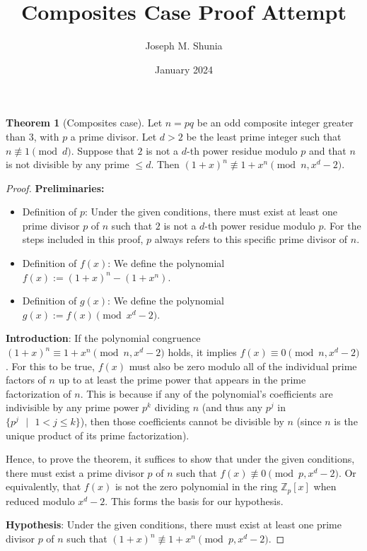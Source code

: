 \documentclass{article}
\title{Composites Case Proof Attempt}
\author{Joseph M. Shunia}
\date{January 2024}
\theoremstyle{plain}
\theoremstyle{definition}
\newtheorem{theorem}{Theorem}
\begin{document}
\maketitle

\begin{theorem}[Composites case] \label{theorem:composites}
Let $n = pq$ be an odd composite integer greater than $3$, with $p$ a prime divisor. Let $d > 2$ be the least prime integer such that $n \not\equiv 1 \pmod{d}$. Suppose that $2$ is not a $d$-th power residue modulo $p$ and that $n$ is not divisible by any prime $\leq d$. Then $(1 + x)^n \not\equiv 1 + x^n \pmod{n, x^d-2}$.
\end{theorem}
\begin{proof}
\textbf{Preliminaries:}
\begin{itemize}
    \item Definition of $p$: Under the given conditions, there must exist at least one prime divisor $p$ of $n$ such that $2$ is not a $d$-th power residue modulo $p$. For the steps included in this proof, $p$ always refers to this specific prime divisor of $n$.
    \item Definition of $f(x)$: We define the polynomial $f(x) := (1 + x)^n - (1 + x^n)$.
    \item Definition of $g(x)$: We define the polynomial $g(x) := f(x) \pmod{x^d - 2}$.
\end{itemize}

\textbf{Introduction}:
If the polynomial congruence $(1 + x)^n \equiv 1 + x^n \pmod{n, x^d-2}$ holds, it implies $f(x) \equiv 0 \pmod{n, x^d-2}$. For this to be true, $f(x)$ must also be zero modulo all of the individual prime factors of $n$ up to at least the prime power that appears in the prime factorization of $n$. This is because if any of the polynomial's coefficients are indivisible by any prime power $p^k$ dividing $n$ (and thus any $p^j$ in $\{ p^j \text{ } | \text{ } 1 < j \leq k \}$), then those coefficients cannot be divisible by $n$ (since $n$ is the unique product of its prime factorization).

Hence, to prove the theorem, it suffices to show that under the given conditions, there must exist a prime divisor $p$ of $n$ such that $f(x) \not\equiv 0 \pmod{p, x^d-2}$. Or equivalently, that $f(x)$ is not the zero polynomial in the ring $\mathbb{Z}_p[x]$ when reduced modulo $x^d-2$. This forms the basis for our hypothesis.

\textbf{Hypothesis}: Under the given conditions, there must exist at least one prime divisor $p$ of $n$ such that $(1 + x)^n \not\equiv 1 + x^n \pmod{p, x^d-2}$.


\end{proof}
\end{document}

